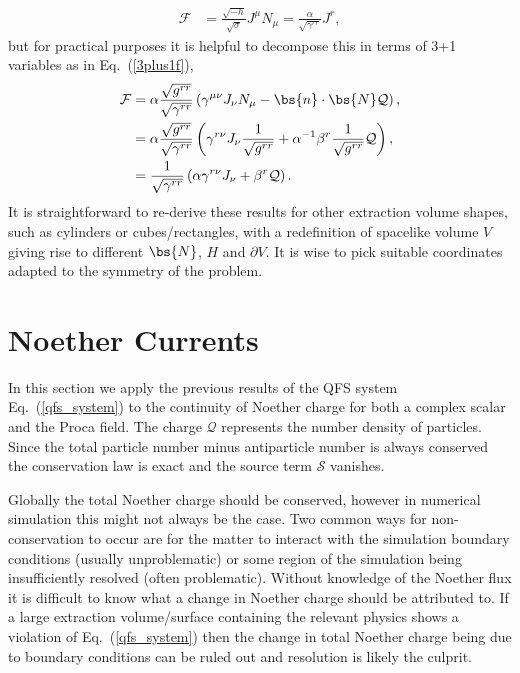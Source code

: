 \begin{align}
 \label{spherical_flux}\mathcal{F}&=  \frac{\sqrt{-h}}{\sqrt{\sigma}} J^\mu N_\mu = \frac{\alpha}{\sqrt{\gamma^{rr}}} J^r, 
 \end{align}
 but for practical purposes it is helpful to decompose this in terms of 3+1 variables as in Eq.~(\ref{3plus1f}),
 \begin{align}
   \mathcal{F} &= \alpha\frac{\sqrt{g^{rr}}}{\sqrt{\gamma^{rr}}} \left(\gamma^{\mu\nu}J_\nu {N}_\mu - \bs{n} \cdot \bs{N} \mathcal{Q}\right), \\
                   &=  \alpha\frac{\sqrt{g^{rr}}}{\sqrt{\gamma^{rr}}}\left(\gamma^{r\nu}J_\nu \frac{1}{\sqrt{g^{rr}}} +\alpha^{-1}\beta^r\frac{1}{\sqrt{g^{rr}}} \mathcal{Q}\right), \\
\label{3plus1fluxspherical}   &= \frac{1}{\sqrt{\gamma^{rr}}}\left(\alpha\gamma^{r\nu}J_\nu  + \beta^r \mathcal{Q}\right).
\end{align}
It is straightforward to re-derive these results for other extraction volume shapes, such as cylinders or cubes/rectangles, with a redefinition of spacelike volume $V$ giving rise to different $\bs{N}$, $H$ and $\partial V$. It is wise to pick suitable coordinates adapted to the symmetry of the problem.

\section{Noether Currents} \label{sect:noether}

In this section we apply the previous results of the QFS system Eq.~(\ref{qfs_system})
to the continuity of Noether charge for both a complex scalar and the Proca field. The charge $\mathcal{Q}$ represents the number density of particles. Since the total particle number minus antiparticle number is always conserved the conservation law is exact and the source term $\mathcal{S}$ vanishes. 

Globally the total Noether charge should be conserved, however in numerical simulation this might not always be the case. Two common ways for non-conservation to occur are for the matter to interact with the simulation boundary conditions (usually unproblematic) or some region of the simulation being insufficiently resolved (often problematic). Without knowledge of the Noether flux it is difficult to know what a change in Noether charge should be attributed to. If a large extraction volume/surface containing the relevant physics shows a violation of Eq.~(\ref{qfs_system}) then the change in total Noether charge being due to boundary conditions can be ruled out and resolution is likely the culprit. 


